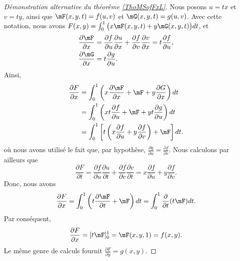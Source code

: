 \begin{proof}[Démonstration alternative du théorème \ref{ThoMSofFxL}]
Nous posons $u=tx$ et $v=ty$, ainsi que $\mF(x,y,t)=f(u,v)$ et $\mG(x,y,t)=g(u,v)$. Avec cette notation, nous avons $F(x,y)=\int_0^1\big( x\mF(x,y,t)+y\mG(x,y,t) \big)dt$, et
\begin{equation}
	\begin{aligned}[]
		\frac{ \partial \mF }{ \partial x }&=\frac{ \partial f }{ \partial u }\frac{ \partial u }{ \partial x }+\frac{ \partial f }{ \partial v }\frac{ \partial v }{ \partial x }=t\frac{ \partial f }{ \partial u },\\
		\frac{ \partial \mG }{ \partial x }&=t\frac{ \partial g }{ \partial u }.
	\end{aligned}
\end{equation}
Ainsi,
\begin{equation}
	\begin{aligned}[]
		\frac{ \partial F }{ \partial x }	&=\int_0^1\left( x\frac{ \partial \mF }{ \partial x }+\mF+y\frac{ \partial G }{ \partial x } \right)dt\\
							&=\int_0^1\left( xt\frac{ \partial f }{ \partial u } +\mF+yt\frac{ \partial g }{ \partial u } \right)dt\\
							&=\int_0^1\left[  t\left( x\frac{ \partial f }{ \partial u }+y\frac{ \partial f }{ \partial v } \right)+\mF  \right]dt.
	\end{aligned}
\end{equation}
où nous avons utilisé le fait que, par hypothèse, $\frac{ \partial g }{ \partial u }=\frac{ \partial f }{ \partial v }$. Nous calculons par ailleurs que
\begin{equation}
	\frac{ \partial F }{ \partial t }=\frac{ \partial f }{ \partial u }\frac{ \partial u }{ \partial t }+\frac{ \partial f }{ \partial v }\frac{ \partial v }{ \partial t }=x\frac{ \partial f }{ \partial u }+y\frac{ \partial f }{ \partial v }.
\end{equation}
Donc, nous avons
\begin{equation}
	\frac{ \partial F }{ \partial x }=\int_0^1\left( t\frac{ \partial \mF }{ \partial t }+\mF \right)dt=\int_0^1\frac{ \partial  }{ \partial t }(t\mF)dt.
\end{equation}
Par conséquent,
\begin{equation}
	\frac{ \partial F }{ \partial x }=[t\mF]_0^1=\mF(x,y,1)=f(x,y).
\end{equation}
Le même genre de calculs fournit $\frac{ \partial F }{ \partial y }=g(x,y)$.
\end{proof}
    
